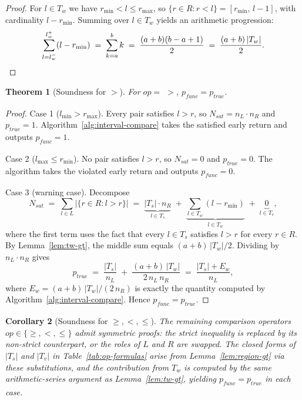 \documentclass[pdflatex,sn-basic]{sn-jnl}%
\theoremstyle{thmstyleone}%
\newtheorem{theorem}{Theorem}%
\newtheorem{corollary}[theorem]{Corollary}%
\theoremstyle{thmstyletwo}%
\theoremstyle{thmstylethree}%
\begin{document}
\begin{proof}
For $l \in T_w$ we have $r_{\min} < l \leq r_{\max}$, so $\{r \in R : r < l\} = [r_{\min},\, l - 1]$, with cardinality $l - r_{\min}$. Summing over $l \in T_w$ yields an arithmetic progression:
\[
\sum_{l = l_w^-}^{l_w^+} (l - r_{\min}) \;=\; \sum_{k = a}^{b} k \;=\; \frac{(a + b)(b - a + 1)}{2} \;=\; \frac{(a + b)\, |T_w|}{2}. \qedhere
\]
\end{proof}

\begin{theorem}[Soundness for $>$]\label{thm:sound-gt}
For $op = ${} $>$, $p_{\mathit{func}} = p_{\mathit{true}}$.
\end{theorem}

\begin{proof}
Case 1 ($l_{\min} > r_{\max}$). Every pair satisfies $l > r$, so $N_{\mathit{sat}} = n_L \cdot n_R$ and $p_{\mathit{true}} = 1$. Algorithm~\ref{alg:interval-compare} takes the satisfied early return and outputs $p_{\mathit{func}} = 1$.

Case 2 ($l_{\max} \leq r_{\min}$). No pair satisfies $l > r$, so $N_{\mathit{sat}} = 0$ and $p_{\mathit{true}} = 0$. The algorithm takes the violated early return and outputs $p_{\mathit{func}} = 0$.

Case 3 (warning case). Decompose
\[
N_{\mathit{sat}} \;=\; \sum_{l \in L} \big|\{r \in R : l > r\}\big| \;=\; \underbrace{|T_s| \cdot n_R}_{l \in T_s} \;+\; \underbrace{\textstyle\sum_{l \in T_w} (l - r_{\min})}_{l \in T_w} \;+\; \underbrace{0}_{l \in T_v},
\]
where the first term uses the fact that every $l \in T_s$ satisfies $l > r$ for every $r \in R$. By Lemma~\ref{lem:tw-gt}, the middle sum equals $(a + b)\, |T_w| / 2$. Dividing by $n_L \cdot n_R$ gives
\[
p_{\mathit{true}} \;=\; \frac{|T_s|}{n_L} \;+\; \frac{(a + b)\, |T_w|}{2\, n_L\, n_R} \;=\; \frac{|T_s| + E_w}{n_L},
\]
where $E_w = (a + b)\, |T_w| / (2\, n_R)$ is exactly the quantity computed by Algorithm~\ref{alg:interval-compare}. Hence $p_{\mathit{func}} = p_{\mathit{true}}$.
\end{proof}

\begin{corollary}[Soundness for $\geq, <, \leq$]\label{cor:sound-other}
The remaining comparison operators $op \in \{\geq, <, \leq\}$ admit symmetric proofs: the strict inequality is replaced by its non-strict counterpart, or the roles of $L$ and $R$ are swapped. The closed forms of $|T_s|$ and $|T_v|$ in Table~\ref{tab:op-formulas} arise from Lemma~\ref{lem:region-gt} via these substitutions, and the contribution from $T_w$ is computed by the same arithmetic-series argument as Lemma~\ref{lem:tw-gt}, yielding $p_{\mathit{func}} = p_{\mathit{true}}$ in each case.
\end{corollary}
\end{document}

